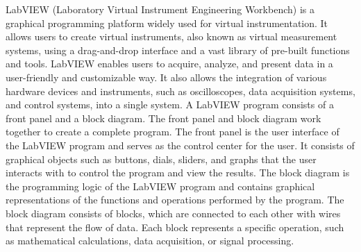 \documentclass[journal=jacsat,manuscript=article]{achemso}
\begin{document}
LabVIEW (Laboratory Virtual Instrument Engineering Workbench) is a graphical programming platform widely used for virtual instrumentation. It allows users to create virtual instruments, also known as virtual measurement systems, using a drag-and-drop interface and a vast library of pre-built functions and tools. LabVIEW enables users to acquire, analyze, and present data in a user-friendly and customizable way. It also allows the integration of various hardware devices and instruments, such as oscilloscopes, data acquisition systems, and control systems, into a single system. A LabVIEW program consists of a front panel and a block diagram. The front panel and block diagram work together to create a complete program. The front panel is the user interface of the LabVIEW program and serves as the control center for the user. It consists of graphical objects such as buttons, dials, sliders, and graphs that the user interacts with to control the program and view the results. The block diagram is the programming logic of the LabVIEW program and contains graphical representations of the functions and operations performed by the program. The block diagram consists of blocks, which are connected to each other with wires that represent the flow of data. Each block represents a specific operation, such as mathematical calculations, data acquisition, or signal processing.
\end{document}
